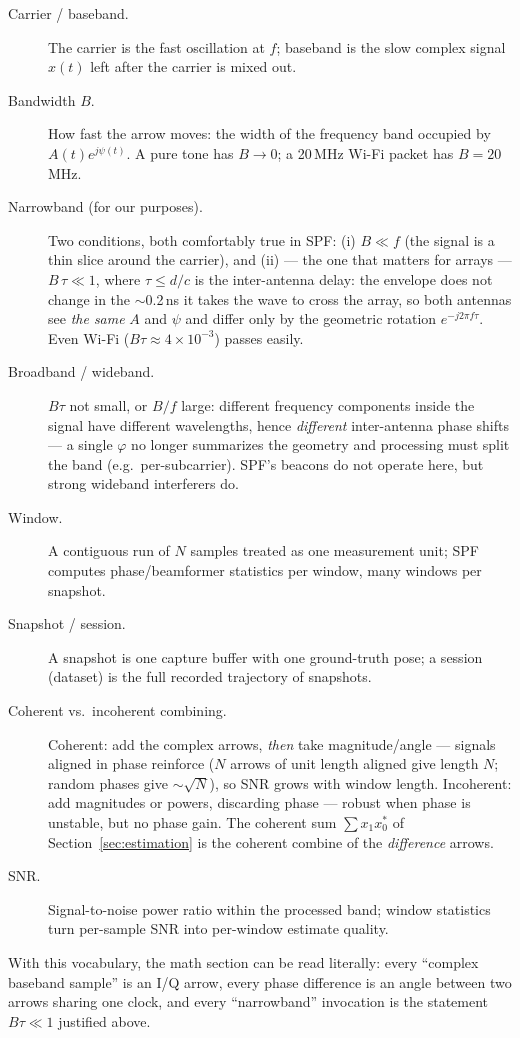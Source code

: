 \begin{description}
  \item[Carrier / baseband.] The carrier is the fast oscillation at $f$;
        baseband is the slow complex signal $x(t)$ left after the carrier is
        mixed out.
  \item[Bandwidth $B$.] How fast the arrow moves: the width of the frequency
        band occupied by $A(t)e^{j\psi(t)}$. A pure tone has $B \to 0$; a
        20\,MHz Wi-Fi packet has $B = 20$\,MHz.
  \item[Narrowband (for our purposes).] Two conditions, both comfortably true
        in SPF: (i) $B \ll f$ (the signal is a thin slice around the
        carrier), and (ii) --- the one that matters for arrays ---
        $B\,\tau \ll 1$, where $\tau \le d/c$ is the inter-antenna delay: the
        envelope does not change in the $\sim$0.2\,ns it takes the wave to
        cross the array, so both antennas see \emph{the same} $A$ and $\psi$
        and differ only by the geometric rotation $e^{-j2\pi f\tau}$. Even
        Wi-Fi ($B\tau \approx 4\times10^{-3}$) passes easily.
  \item[Broadband / wideband.] $B\tau$ not small, or $B/f$ large: different
        frequency components inside the signal have different wavelengths,
        hence \emph{different} inter-antenna phase shifts --- a single
        $\varphi$ no longer summarizes the geometry and processing must split
        the band (e.g.\ per-subcarrier). SPF's beacons do not operate here,
        but strong wideband interferers do.
  \item[Window.] A contiguous run of $N$ samples treated as one measurement
        unit; SPF computes phase/beamformer statistics per window, many
        windows per snapshot.
  \item[Snapshot / session.] A snapshot is one capture buffer with one
        ground-truth pose; a session (dataset) is the full recorded
        trajectory of snapshots.
  \item[Coherent vs.\ incoherent combining.] Coherent: add the complex
        arrows, \emph{then} take magnitude/angle --- signals aligned in phase
        reinforce ($N$ arrows of unit length aligned give length $N$; random
        phases give $\sim\sqrt{N}$), so SNR grows with window length.
        Incoherent: add magnitudes or powers, discarding phase --- robust
        when phase is unstable, but no phase gain. The coherent sum
        $\sum x_1 x_0^{*}$ of Section~\ref{sec:estimation} is the coherent
        combine of the \emph{difference} arrows.
  \item[SNR.] Signal-to-noise power ratio within the processed band; window
        statistics turn per-sample SNR into per-window estimate quality.
\end{description}

With this vocabulary, the math section can be read literally: every
``complex baseband sample'' is an I/Q arrow, every phase difference is an
angle between two arrows sharing one clock, and every ``narrowband''
invocation is the statement $B\tau \ll 1$ justified above.
